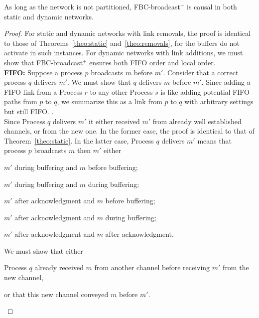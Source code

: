 

\begin{theorem}
  As long as the network is not partitioned, FBC-broadcast$^+$ is causal in both
  static and dynamic networks.
\end{theorem}

\begin{proof}
  For static and dynamic networks with link removals, the proof is identical to
  those of Theorems~\ref{theo:static} and~\ref{theo:removals}, for the buffers
  do not activate in such instances. For dynamic networks with link additions,
  we must show that FBC-broadcast$^+$ ensures both
  FIFO order and local order. \\
  \textbf{FIFO:} Suppose a process $p$ broadcasts $m$ before $m'$. Consider that
  a correct process $q$ delivers $m'$. We must show that $q$ delivers $m$ before
  $m'$.  Since adding a FIFO link from a Process $r$ to any other Process $s$ is
  like adding potential FIFO paths from $p$ to $q$, we summarize this as a link
  from $p$ to $q$ with arbitrary settings but still FIFO.  . \\   
  Since Process $q$ delivers $m'$ it either received $m'$ from already well
  established channels, or from the new one. In the former case, the proof is
  identical to that of Theorem~\ref{theo:static}. In the latter case, Process
  $q$ delivers $m'$ means that process $p$ broadcasts $m$ then $m'$ either
  \begin{inparaenum}[(i)]
  \item \label{case:one} $m'$ during buffering and $m$ before buffering;
  \item \label{case:two} $m'$ during buffering and $m$ during buffering;
  \item \label{case:three} $m'$ after acknowledgment and $m$ before buffering;
  \item \label{case:four} $m'$ after acknowledgment and $m$ during buffering;
  \item \label{case:five} $m'$ after acknowledgment and $m$ after acknowledgment.
  \end{inparaenum}
  We must show that either 
  \begin{inparaenum}[(1)]
  \item \label{show:one} Process $q$ already received $m$ from another channel
    before receiving $m'$ from the new channel,
  \item \label{show:two} or that this new channel conveyed $m$ before $m'$.
  \end{inparaenum}


\end{proof}

